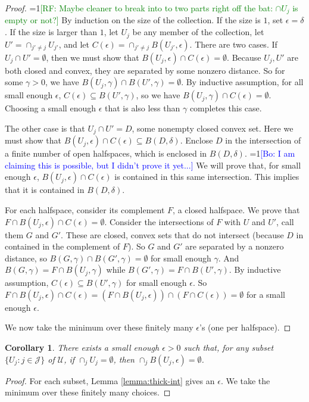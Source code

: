 \documentclass{article}
\newcommand{\Comments}{1}
\newcommand{\mynote}[2]{\ifnum\Comments=1\textcolor{#1}{#2}\fi}
\newcommand{\raf}[1]{\mynote{green}{[RF: #1]}}
\newcommand{\bo}[1]{\mynote{blue}{[Bo: #1]}}
\newtheorem{corollary}{Corollary}
\begin{document}
\begin{proof}
  \raf{Maybe cleaner to break into to two parts right off the bat: $\cap U_j$ is empty or not?}
  By induction on the size of the collection.
  If the size is $1$, set $\epsilon = \delta$.
  If the size is larger than $1$, let $U_j$ be any member of the collection, let $U' = \cap_{j'\neq j} U_{j'}$, and let $C(\epsilon) = \cap_{j' \neq j} B(U_{j'},\epsilon)$.
  There are two cases.
  If $U_j \cap U' = \emptyset$, then we must show that $B(U_j,\epsilon) \cap C(\epsilon) = \emptyset$.
  Because $U_j,U'$ are both closed and convex, they are separated by some nonzero distance. So for some $\gamma > 0$, we have $B(U_j,\gamma) \cap B(U',\gamma) = \emptyset$.
  By inductive assumption, for all small enough $\epsilon$, $C(\epsilon) \subseteq B(U',\gamma)$, so we have $B(U_j,\gamma) \cap C(\epsilon) = \emptyset$.
  Choosing a small enough $\epsilon$ that is also less than $\gamma$ completes this case.

  The other case is that $U_j \cap U' = D$, some nonempty closed convex set.
  Here we must show that $B(U_j,\epsilon) \cap C(\epsilon) \subseteq B(D, \delta)$.
  Enclose $D$ in the intersection of a finite number of open halfspaces, which is enclosed in $B(D,\delta)$. \bo{I am claiming this is possible, but I didn't prove it yet...}
  We will prove that, for small enough $\epsilon$, $B(U_j,\epsilon) \cap C(\epsilon)$ is contained in this same intersection.
  This implies that it is contained in $B(D,\delta)$.

  For each halfspace, consider its complement $F$, a closed halfspace.
  We prove that $F \cap B(U_j,\epsilon) \cap C(\epsilon) = \emptyset$.
  Consider the intersections of $F$ with $U$ and $U'$, call them $G$ and $G'$.
  These are closed, convex sets that do not intersect (because $D$ in contained in the complement of $F$).
  So $G$ and $G'$ are separated by a nonzero distance, so $B(G,\gamma) \cap B(G',\gamma) = \emptyset$ for small enough $\gamma$.
  And $B(G,\gamma) = F \cap B(U_j,\gamma)$ while $B(G',\gamma) = F \cap B(U',\gamma)$.
  By inductive assumption, $C(\epsilon) \subseteq B(U',\gamma)$ for small enough $\epsilon$.
  So $F \cap B(U_j,\epsilon) \cap C(\epsilon) = \left(F \cap B(U_j,\epsilon)\right) \cap \left(F \cap C(\epsilon)\right) = \emptyset$ for a small enough $\epsilon$.

  We now take the minimum over these finitely many $\epsilon$'s (one per halfspace).
\end{proof}
  
\begin{corollary} \label{cor:thick-intersect}
  There exists a small enough $\epsilon > 0$ such that, for any subset $\{U_j : j \in \mathcal{J}\}$ of $\mathcal{U}$, if $\cap_j U_j = \emptyset$, then $\cap_j B(U_j,\epsilon) = \emptyset$.
\end{corollary}
\begin{proof}
  For each subset, Lemma \ref{lemma:thick-int} gives an $\epsilon$.
  We take the minimum over these finitely many choices.
\end{proof}
\end{document}
